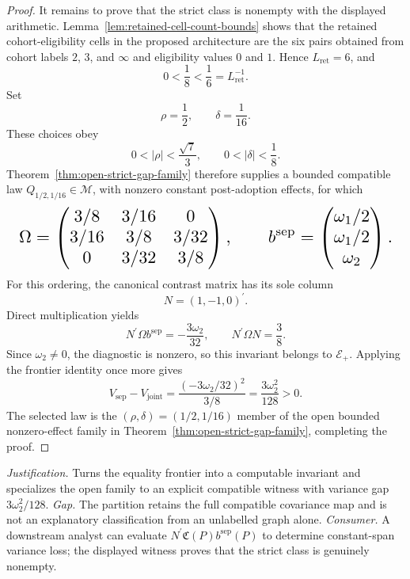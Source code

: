 \documentclass{article}
\begin{document}
\begin{proof}
It remains to prove that the strict class is nonempty with the displayed arithmetic. Lemma~\ref{lem:retained-cell-count-bounds} shows that the retained cohort-eligibility cells in the proposed architecture are the six pairs obtained from cohort labels \(2\), \(3\), and \(\infty\) and eligibility values \(0\) and \(1\). Hence \(L_{\mathrm{ret}}=6\), and
\[
 0<\frac18<\frac16=L_{\mathrm{ret}}^{-1}.
\]
Set
\[
 \rho=\frac12,
 \qquad
 \delta=\frac1{16}.
\]
These choices obey
\[
 0<|\rho|<\frac{\sqrt7}{3},
 \qquad
 0<|\delta|<\frac18.
\]
Theorem~\ref{thm:open-strict-gap-family} therefore supplies a bounded compatible law \(Q_{1/2,1/16}\in\mathcal M\), with nonzero constant post-adoption effects, for which
\[
\makebox[\linewidth][c]{\resizebox{0.98\linewidth}{!}{\(\displaystyle \Omega=
 \begin{pmatrix}
 3/8&3/16&0\\
 3/16&3/8&3/32\\
 0&3/32&3/8
 \end{pmatrix},
 \qquad
 b^{\mathrm{sep}}=
 \begin{pmatrix}
 \omega_1/2\\
 \omega_1/2\\
 \omega_2
 \end{pmatrix}.\)}}
\]
For this ordering, the canonical contrast matrix has its sole column
\[
 N=(1,-1,0)^{\prime}.
\]
Direct multiplication yields
\[
 N^{\prime}\Omega b^{\mathrm{sep}}=-\frac{3\omega_2}{32},
 \qquad
 N^{\prime}\Omega N=\frac38.
\]
Since \(\omega_2\ne0\), the diagnostic is nonzero, so this invariant belongs to \(\mathscr E_+\). Applying the frontier identity once more gives
\[
 V_{\mathrm{sep}}-V_{\mathrm{joint}}
 =\frac{(-3\omega_2/32)^2}{3/8}
 =\frac{3\omega_2^2}{128}>0.
\]
The selected law is the \((\rho,\delta)=(1/2,1/16)\) member of the open bounded nonzero-effect family in Theorem~\ref{thm:open-strict-gap-family}, completing the proof.
\end{proof}
\par\smallskip\noindent \textit{Justification.} Turns the equality frontier into a computable invariant and specializes the open family to an explicit compatible witness with variance gap \(3\omega_2^2/128\). \textit{Gap.} The partition retains the full compatible covariance map and is not an explanatory classification from an unlabelled graph alone. \textit{Consumer.} A downstream analyst can evaluate \(N^{\prime}\mathfrak C(P)b^{\mathrm{sep}}(P)\) to determine constant-span variance loss; the displayed witness proves that the strict class is genuinely nonempty.
\end{document}
